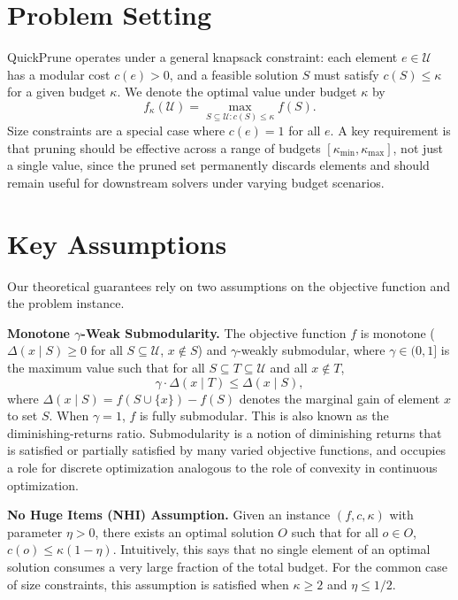 \section{Problem Setting}

QuickPrune operates under a general knapsack constraint: each element $e \in \mathcal{U}$
has a modular cost $c(e) > 0$, and a feasible solution $S$ must satisfy $c(S) \leq \kappa$
for a given budget $\kappa$. We denote the optimal value under budget $\kappa$ by
\[
f_{\kappa}(\mathcal{U}) = \max_{S \subseteq \mathcal{U} : c(S) \leq \kappa} f(S).
\]
Size constraints are a special case where $c(e) = 1$ for all $e$. A key requirement is
that pruning should be effective across a range of budgets
$[\kappa_{\min}, \kappa_{\max}]$, not just a single value, since the pruned set
permanently discards elements and should remain useful for downstream solvers under
varying budget scenarios.

\section{Key Assumptions}

Our theoretical guarantees rely on two assumptions on the objective function and the
problem instance.

\textbf{Monotone $\gamma$-Weak Submodularity.} The objective function $f$ is monotone
($\Delta(x \mid S) \geq 0$ for all $S \subseteq \mathcal{U}$, $x \notin S$) and
$\gamma$-weakly submodular, where $\gamma \in (0, 1]$ is the maximum value such that for
all $S \subseteq T \subseteq \mathcal{U}$ and all $x \notin T$,
\[
\gamma \cdot \Delta(x \mid T) \leq \Delta(x \mid S),
\]
where $\Delta(x \mid S) = f(S \cup \{x\}) - f(S)$ denotes the marginal gain of element
$x$ to set $S$. When $\gamma = 1$, $f$ is fully submodular. This is also known as the
diminishing-returns ratio. Submodularity is a notion of diminishing returns that is
satisfied or partially satisfied by many varied objective functions, and occupies a role
for discrete optimization analogous to the role of convexity in continuous optimization.

\textbf{No Huge Items (NHI) Assumption.} Given an instance $(f, c, \kappa)$ with
parameter $\eta > 0$, there exists an optimal solution $O$ such that for all $o \in O$,
$c(o) \leq \kappa(1 - \eta)$. Intuitively, this says that no single element of an
optimal solution consumes a very large fraction of the total budget. For the common case
of size constraints, this assumption is satisfied when $\kappa \geq 2$ and
$\eta \leq 1/2$.

